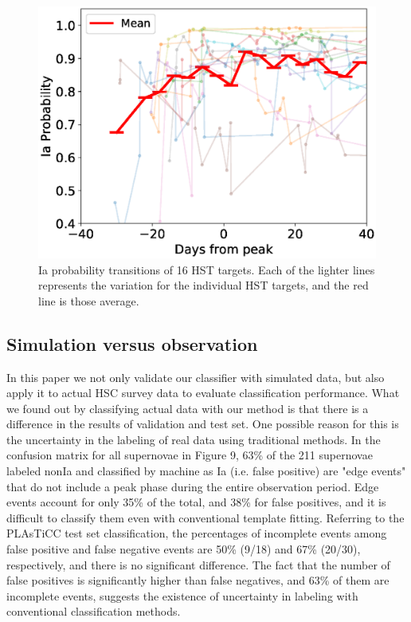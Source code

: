 \documentclass[useamsfonts]{pasj01}
\begin{document}
%
%
\begin{figure}[ht]
  \begin{center}
     \includegraphics[width=\columnwidth]{figures/HST_DaysFromPeak_vs_IaProbability_200108.eps}
  \end{center}
  \caption{%
  Ia probability transitions of 16 HST targets. Each of the lighter lines represents the variation for the individual HST targets, and the red line is those average.
  }%
  \label{fig:HSTIaprob}
\end{figure}
%
%
\subsection{Simulation versus observation}
%
In this paper we not only validate our classifier with simulated data, but also apply it to actual HSC survey data to evaluate classification performance.
What we found out by classifying actual data with our method is that there is a difference in the results of validation and test set.
One possible reason for this is the uncertainty in the labeling of real data using traditional methods.
In the confusion matrix for all supernovae in Figure 9, 63\% of the 211 supernovae labeled nonIa and classified by machine as Ia (i.e. false positive) are "edge events" that do not include a peak phase during the entire observation period.
Edge events account for only 35\% of the total, and 38\% for false positives, and it is difficult to classify them even with conventional template fitting.
Referring to the PLAsTiCC test set classification, the percentages of incomplete events among false positive and false negative events are 50\% (9/18) and 67\% (20/30), respectively, and there is no significant difference.
The fact that the number of false positives is significantly higher than false negatives, and 63\% of them are incomplete events, suggests the existence of uncertainty in labeling with conventional classification methods.
\end{document}
